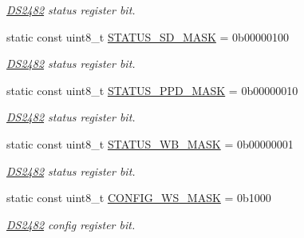 \begin{DoxyCompactItemize}
\begin{DoxyCompactList}\small\item\em \mbox{\hyperlink{class_d_s2482}{D\+S2482}} status register bit. \end{DoxyCompactList}\item 
\mbox{\label{class_d_s2482_command_a933373d6e615e05a6bf3c9b551c86939}} 
static const uint8\+\_\+t \mbox{\hyperlink{class_d_s2482_command_a933373d6e615e05a6bf3c9b551c86939}{S\+T\+A\+T\+U\+S\+\_\+\+S\+D\+\_\+\+M\+A\+SK}} = 0b00000100
\begin{DoxyCompactList}\small\item\em \mbox{\hyperlink{class_d_s2482}{D\+S2482}} status register bit. \end{DoxyCompactList}\item 
\mbox{\label{class_d_s2482_command_a193e66bb27a0293eb80de85f45ce1543}} 
static const uint8\+\_\+t \mbox{\hyperlink{class_d_s2482_command_a193e66bb27a0293eb80de85f45ce1543}{S\+T\+A\+T\+U\+S\+\_\+\+P\+P\+D\+\_\+\+M\+A\+SK}} = 0b00000010
\begin{DoxyCompactList}\small\item\em \mbox{\hyperlink{class_d_s2482}{D\+S2482}} status register bit. \end{DoxyCompactList}\item 
\mbox{\label{class_d_s2482_command_a26cd10671e15478699cdeff553b27e8d}} 
static const uint8\+\_\+t \mbox{\hyperlink{class_d_s2482_command_a26cd10671e15478699cdeff553b27e8d}{S\+T\+A\+T\+U\+S\+\_\+W\+B\+\_\+\+M\+A\+SK}} = 0b00000001
\begin{DoxyCompactList}\small\item\em \mbox{\hyperlink{class_d_s2482}{D\+S2482}} status register bit. \end{DoxyCompactList}\item 
\mbox{\label{class_d_s2482_command_a4734885803c7db24656cc7d4bee8d00e}} 
static const uint8\+\_\+t \mbox{\hyperlink{class_d_s2482_command_a4734885803c7db24656cc7d4bee8d00e}{C\+O\+N\+F\+I\+G\+\_\+W\+S\+\_\+\+M\+A\+SK}} = 0b1000
\begin{DoxyCompactList}\small\item\em \mbox{\hyperlink{class_d_s2482}{D\+S2482}} config register bit. \end{DoxyCompactList}\item 

\end{DoxyCompactItemize}
